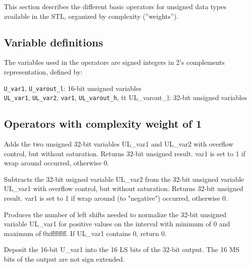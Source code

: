 This section describes the different basic operators for unsigned data types available in the STL, organized by complexity (”weights”).

\subsection{Variable definitions}

The variables used in the operators are signed integers in 2's complements representation, defined by:

{\tt U\_var1}, {\tt U\_varout\_l}: 16-bit unsigned variables\\
{\tt UL\_var1}, {\tt UL\_var2}, {\tt var1}, {\tt UL\_varout\_h}, {tt UL\_varout\_l}: 32-bit unsigned variables


\subsection{Operators with complexity weight of 1}


Adds the two unsigned 32-bit variables UL\_var1 and UL\_var2 with overflow control, but without saturation.
Returns 32-bit unsigned result.
var1 is set to 1 if wrap around occurred, otherwise 0.


Subtracts the 32-bit usigned variable UL\_var2 from the 32-bit unsigned variable UL\_var1 with overflow control, but without saturation.
Returns 32-bit unsigned result.
var1 is set to 1 if wrap around (to "negative") occurred, otherwise 0.


Produces the number of left shifts needed to normalize the 32-bit unsigned variable UL\_var1 for positive values on the interval with minimum of 0 and maximum of 0xffffffff.
If UL\_var1 contains 0, return 0.


Deposit the 16-bit U\_var1 into the 16 LS bits of the 32-bit output. The 16 MS bits of the output are not sign extended.

